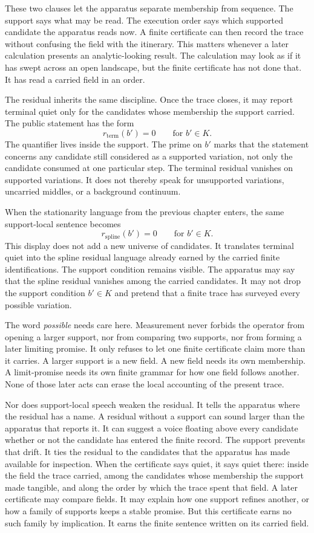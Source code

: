 These two clauses let the apparatus separate membership from sequence. The
support says what may be read. The execution order says which supported
candidate the apparatus reads now. A finite certificate can then record the
trace without confusing the field with the itinerary. This matters whenever a
later calculation presents an analytic-looking result. The calculation may
look as if it has swept across an open landscape, but the finite certificate
has not done that. It has read a carried field in an order.

The residual inherits the same discipline. Once the trace closes, it may
report terminal quiet only for the candidates whose membership the support
carried. The public statement has the form
\[
  r_{\mathrm{term}}(b')=0
  \qquad \text{for } b' \in K.
\]
The quantifier lives inside the support. The prime on \(b'\) marks that the statement concerns any candidate still considered as a supported variation, not only the candidate consumed at one particular step. The
terminal residual vanishes on supported variations. It does not thereby speak
for unsupported variations, uncarried middles, or a background continuum.

When the stationarity language from the previous chapter enters, the same
support-local sentence becomes
\[
  r_{\mathrm{spline}}(b')=0
  \qquad \text{for } b' \in K.
\]
This display does not add a new universe of candidates. It translates terminal
quiet into the spline residual language already earned by the carried finite
identifications. The support condition remains visible. The apparatus may say that the spline residual vanishes among the carried candidates. It may not drop the support condition \(b' \in K\) and pretend that a finite trace has surveyed every possible variation.

The word \emph{possible} needs care here. Measurement never forbids the operator
from opening a larger support, nor from comparing two supports, nor from
forming a later limiting promise. It only refuses to let one finite
certificate claim more than it carries. A larger support is a new field. A new
field needs its own membership. A limit-promise needs its own finite grammar
for how one field follows another. None of those later acts can erase the
local accounting of the present trace.

Nor does support-local speech weaken the residual. It tells the apparatus where
the residual has a name. A residual without a support can sound larger than the
apparatus that reports it. It can suggest a voice floating above every
candidate whether or not the candidate has entered the finite record. The
support prevents that drift. It ties the residual to the candidates that the
apparatus has made available for inspection. When the certificate says quiet,
it says quiet there: inside the field the trace carried, among the candidates
whose membership the support made tangible, and along the order by which the
trace spent that field. A later certificate may compare fields. It may explain
how one support refines another, or how a family of supports keeps a stable
promise. But this certificate earns no such family by implication. It earns
the finite sentence written on its carried field.

